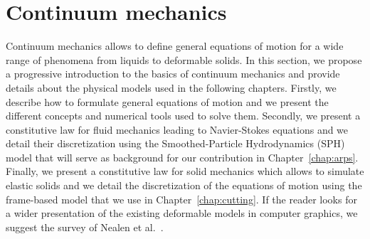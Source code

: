 \section{Continuum mechanics}
\label{sec:continuumMechanics}
Continuum mechanics allows to define general equations of motion for a wide range of phenomena from liquids to deformable solids. 
In this section, we propose a progressive introduction to the basics of continuum mechanics and provide details about the physical models used in the following chapters. 
Firstly, we describe how to formulate general equations of motion and we present the different concepts and numerical tools used to solve them.
Secondly, we present a constitutive law for fluid mechanics leading to Navier-Stokes equations and we detail their discretization using the Smoothed-Particle Hydrodynamics (SPH) model that will serve as background for our contribution in Chapter~\ref{chap:arps}.
Finally, we present a constitutive law for solid mechanics which allows to simulate elastic solids and we detail the discretization of the equations of motion using the frame-based model that we use in Chapter~\ref{chap:cutting}.
If the reader looks for a wider presentation of the existing deformable models in computer graphics, we suggest the survey of Nealen et al.~\cite{Nealen2006}.
%
